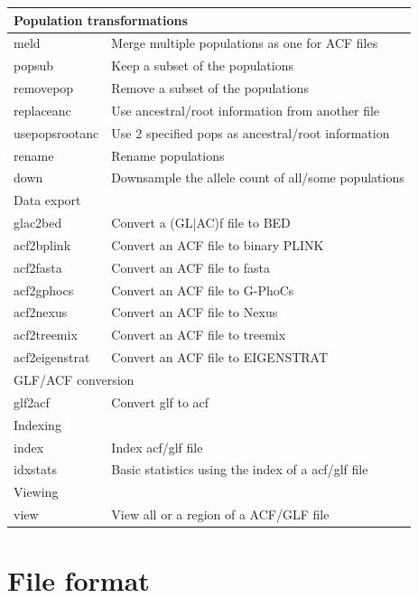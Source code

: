 \documentclass[a4paper]{article}
\begin{document}
\begin{tabular}{|l|l|}
\hline
\multicolumn{2}{|l|}{Population transformations} \\
\hline
      meld        &    Merge multiple populations as one for ACF files \\
      popsub      &    Keep a subset of the populations \\
      removepop   &    Remove a subset of the populations \\
      replaceanc  &    Use ancestral/root information from another file \\
      usepopsrootanc &  Use 2 specified pops as ancestral/root information \\
      rename      &    Rename populations \\
      down        &   Downsample the allele count of all/some populations \\
\hline
\multicolumn{2}{|l|}{Data export} \\
\hline
      glac2bed    &    Convert a (GL|AC)f file to BED \\
      acf2bplink  &    Convert an ACF file to binary PLINK \\
      acf2fasta   &    Convert an ACF file to fasta \\
      acf2gphocs  &    Convert an ACF file to G-PhoCs \\
      acf2nexus   &    Convert an ACF file to Nexus \\
      acf2treemix &    Convert an ACF file to treemix \\
      acf2eigenstrat &  Convert an ACF file to EIGENSTRAT \\
\hline
\multicolumn{2}{|l|}{GLF/ACF conversion} \\
\hline
      glf2acf     &    Convert glf to acf  \\
\hline
\multicolumn{2}{|l|}{Indexing} \\
\hline
      index       &    Index acf/glf file \\
      idxstats    &    Basic statistics using the index of a acf/glf file \\
\hline
\multicolumn{2}{|l|}{Viewing}\\ 
\hline
      view        &    View all or a region of a ACF/GLF file  \\
\hline
\end{tabular}

\section{File format}
\end{document}
